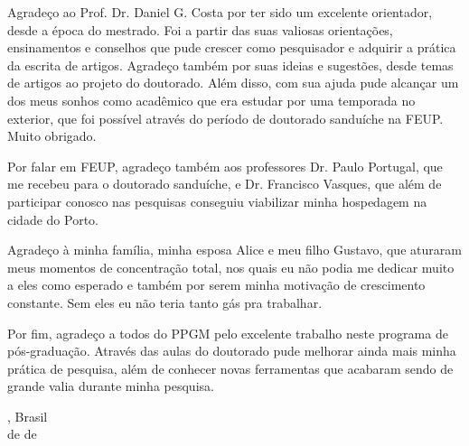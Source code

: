 
\begin{agradecimentos}

Agradeço ao Prof. Dr. Daniel G. Costa por ter sido um excelente orientador, desde a época do mestrado. Foi a partir das suas valiosas orientações, ensinamentos e conselhos que pude crescer como pesquisador e adquirir a prática da escrita de artigos. Agradeço também por suas ideias e sugestões, desde temas de artigos ao projeto do doutorado. Além disso, com sua ajuda pude alcançar um dos meus sonhos como acadêmico que era estudar por uma temporada no exterior, que foi possível através do período de doutorado sanduíche na FEUP. Muito obrigado.

Por falar em FEUP, agradeço também aos professores Dr. Paulo Portugal, que me recebeu para o doutorado sanduíche, e Dr. Francisco Vasques, que além de participar conosco nas pesquisas conseguiu viabilizar minha hospedagem na cidade do Porto.

Agradeço à minha família, minha esposa Alice e meu filho Gustavo, que aturaram meus momentos de concentração total, nos quais eu não podia me dedicar muito a eles como esperado e também por serem minha motivação de crescimento constante. Sem eles eu não teria tanto gás pra trabalhar.

Por fim, agradeço a todos do PPGM pelo excelente trabalho neste programa de pós-graduação. Através das aulas do doutorado pude melhorar ainda mais minha prática de pesquisa, além de conhecer novas ferramentas que acabaram sendo de grande valia durante minha pesquisa.

\noindent
\ppgmcidade, Brasil \hfill \theauthor\\
\ppgmdia\space de \ppgmmes\space de \ppgmano
\end{agradecimentos}
